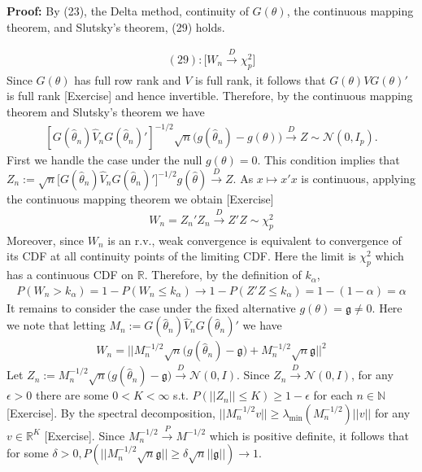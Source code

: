 \documentclass[10pt]{article}
\begin{document}
\textbf{Proof:} By (23), the Delta method, continuity of $G(\theta)$, the continuous mapping theorem, and Slutsky's theorem, (29) holds.

\begin{gather*}
    (29):\Bigg[W_n \xrightarrow{D}\chi_p^2\Bigg]
\end{gather*}
Since $G(\theta)$ has full row rank and $V $ is full rank, it follows that $G(\theta)VG(\theta)' $ is full rank [Exercise] and hence invertible. Therefore, by the continuous mapping theorem and Slutsky's theorem we have 
\begin{gather*}
    \left[G(\hat{\theta}_n)\hat{V}_nG(\hat{\theta}_n)'\right]^{-1/ 2}\sqrt{n}\big(g(\hat{\theta}_n) - g(\theta)\big) \xrightarrow{D}Z\sim \mathcal{N}(0, I_p).
\end{gather*}
First we handle the case under the null $g(\theta) = 0 $. This condition implies that \\$Z_n := \sqrt{n}\big[G(\hat{\theta}_n)\hat{V}_nG(\hat{\theta}_n)'\big]^{-1 / 2}g(\hat{\theta}) \xrightarrow{D}Z $. As $x \mapsto x'x $ is continuous, applying the continuous mapping theorem we obtain [Exercise]
\begin{gather*}
    W_n = Z_n'Z_n\xrightarrow{D}Z'Z\sim\chi_p^2
\end{gather*}
Moreover, since $W_n $ is an r.v., weak convergence is equivalent to convergence of its CDF at all continuity points of the limiting CDF. Here the limit is $\chi_p^2 $ which has a continuous CDF on $\mathbb{R} $. Therefore, by the definition of $k_\alpha $,
\begin{gather*}
    P(W_n > k_\alpha) = 1 - P(W_n \le k_\alpha) \to 1 - P(Z'Z \le k_\alpha) = 1 - (1 - \alpha) = \alpha
\end{gather*}
\newpage
It remains to consider the case under the fixed alternative $g(\theta) = \mathfrak{g} \neq 0 $. Here we note that letting $M_n := G(\hat{\theta}_n)\hat{V}_nG(\hat{\theta}_n)'$ we have
\begin{gather*}
    W_n = ||M_n^{-1 / 2}\sqrt{n}\big(g(\hat{\theta}_n) - \mathfrak{g}\big) + M_n^{-1 / 2}\sqrt{n}\mathfrak{g}||^2
\end{gather*}
Let $Z_n := M_n^{-1 / 2}\sqrt{n}\big(g(\hat{\theta}_n) - \mathfrak{g}\big) \xrightarrow{D}\mathcal{N}(0, I)$. Since $Z_n \xrightarrow{D}\mathcal{N}(0, I)$, for any $\epsilon > 0 $ there are some $0 < K < \infty $ s.t. $P(||Z_n|| \le K) \ge 1 - \epsilon $ for each $n \in \mathbb{N}$ [Exercise]. By the spectral decomposition, $||M_n^{-1 / 2}v|| \ge \lambda_{\min}(M_n^{-1 / 2})||v|| $ for any $v \in \mathbb{R}^K $ [Exercise]. Since $M_n^{-1 / 2} \xrightarrow{P} M^{-1 / 2} $ which is positive definite, it follows that for some $\delta > 0, P(||M_n^{-1 / 2}\sqrt{n}\mathfrak{g}|| \ge \delta\sqrt{n}||\mathfrak{g}||)\to 1 $.
\end{document}
